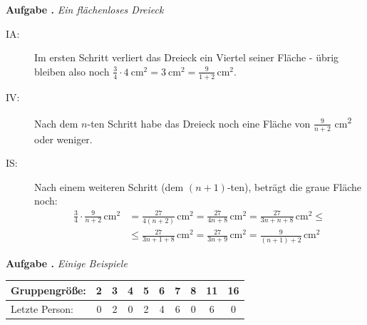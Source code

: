 \documentclass[a4paper,ngerman,12pt]{scrartcl}
\theoremstyle{definition}
\theoremstyle{plain}
\theoremstyle{remark}
\newlength{\aufgabenskip}
\newcounter{aufgabennummer}
\newenvironment{aufgabe}[1]{
	\addtocounter{aufgabennummer}{1}
	\textbf{Aufgabe \theaufgabennummer.} \emph{#1} \par
}{\vspace{\aufgabenskip}}
\begin{document}
\begin{aufgabe}{Ein flächenloses Dreieck}
	\begin{description}
		\item[IA:] Im ersten Schritt verliert das Dreieck ein Viertel seiner Fläche - übrig bleiben also noch $\frac{3}{4}\cdot \SI{4}{\cm\squared} = \SI{3}{\cm\squared} = \frac{9}{1+2}\,\si{\cm\squared}$.
		\item[IV:] Nach dem $n$-ten Schritt habe das Dreieck noch eine Fläche von $\frac{9}{n+2}$ \si{\cm\squared} oder weniger.
		\item[IS:] Nach einem weiteren Schritt (dem $(n+1)$-ten), beträgt die graue Fläche noch:
			\begin{align*}
			\frac{3}{4}\cdot\frac{9}{n+2}\,\si{\cm\squared} &= \frac{27}{4(n+2)}\,\si{\cm\squared} = \frac{27}{4n+8}\,\si{\cm\squared} = \frac{27}{3n+n+8}\,\si{\cm\squared} \leq \\
			&\leq \frac{27}{3n+1+8}\,\si{\cm\squared} = \frac{27}{3n+9}\,\si{\cm\squared} = \frac{9}{(n+1)+2}\,\si{\cm\squared}
			\end{align*}
		\end{description}
\end{aufgabe}

\begin{aufgabe}{Einige Beispiele}\label{aufgabe:JosephusBspe}
	\begin{center}
		\renewcommand{\arraystretch}{2}\setlength{\tabcolsep}{1em}
		\begin{tabular}{l||c|c|c|c|c|c|c|c|c}
			Gruppengröße:	& 2	& 3 & 4 & 5 & 6 & 7 & 8 & 11 & 16 \\\hline
			Letzte Person:	& 0 & 2 & 0 & 2 & 4 & 6 & 0 & 6  & 0  
		\end{tabular}
	\end{center}
\end{aufgabe}
\end{document}
